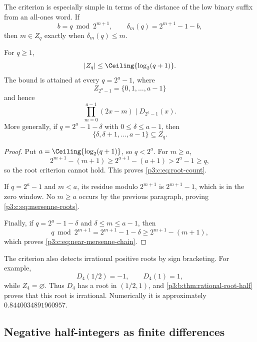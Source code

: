 \documentclass[11pt,oneside]{article}
\numberwithin{equation}{section}
\theoremstyle{definition}
\theoremstyle{remark}
\begin{document}
The criterion is especially simple in terms of the distance of the low
binary suffix from an all-ones word.  If
\[
 b=q\bmod2^{m+1},
 \qquad
 \delta_m(q)=2^{m+1}-1-b,
\]
then \(m\in Z_q\) exactly when \(\delta_m(q)\leq m\).

\begin{proposition}
For \(q\geq1\),
\begin{equation}
 |Z_q|\leq\Ceiling{\log_2(q+1)}.              \label{p3:c:eq:root-count}
\end{equation}
The bound is attained at every \(q=2^a-1\), where
\begin{equation}
 Z_{2^a-1}=\{0,1,\ldots,a-1\}                              \label{p3:c:eq:mersenne-roots}
\end{equation}
and hence
\begin{equation}
 \prod_{m=0}^{a-1}(2x-m)\mid D_{2^a-1}(x).              \label{p3:c:eq:mersenne-factor}
\end{equation}
More generally, if
\(q=2^a-1-\delta\) with \(0\leq\delta\leq a-1\), then
\begin{equation}
 \{\delta,\delta+1,\ldots,a-1\}\subseteq Z_q.             \label{p3:c:eq:near-mersenne-chain}
\end{equation}
\end{proposition}

\begin{proof}
Put \(a=\Ceiling{\log_2(q+1)}\), so \(q<2^a\).  For
\(m\geq a\),
\[
 2^{m+1}-(m+1)\geq2^{a+1}-(a+1)>2^a-1\geq q,
\]
so the root criterion cannot hold.  This proves \cref{p3:c:eq:root-count}.

If \(q=2^a-1\) and \(m<a\), its residue modulo \(2^{m+1}\) is
\(2^{m+1}-1\), which is in the zero window.  No \(m\geq a\) occurs by the
previous paragraph, proving \cref{p3:c:eq:mersenne-roots}.

Finally, if \(q=2^a-1-\delta\) and
\(\delta\leq m\leq a-1\), then
\[
 q\bmod2^{m+1}=2^{m+1}-1-\delta
 \geq2^{m+1}-(m+1),
\]
which proves \cref{p3:c:eq:near-mersenne-chain}.
\end{proof}
The criterion also detects irrational positive roots by sign bracketing.  For
example,
\[
 D_4(1/2)=-1,
 \qquad
 D_4(1)=1,
\]
while \(Z_4=\varnothing\).  Thus \(D_4\) has a root in
\((1/2,1)\), and \cref{p3:b:thm:rational-root-half} proves that this root is
irrational.  Numerically it is approximately
\(0.8440034891960957\).
\subsection{Negative half-integers as finite differences}
\end{document}
